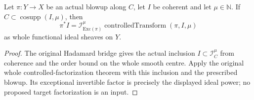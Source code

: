 \begin{lemma}
\label{pub:hadamard-whole-controlled-factor}
\leanok
Let $\pi:Y\to X$ be an actual blowup along $C$, let $I$ be coherent and let
$\mu\in\mathbb N$. If $C\subset\operatorname{cosupp}(I,\mu)$, then
\[
 \pi^*I=\mathcal I_{\mathrm{Exc}(\pi)}^{\mu}
          \operatorname{controlledTransform}(\pi,I,\mu)
\]
as whole functional ideal sheaves on $Y$.
\end{lemma}
\begin{proof}
The original Hadamard bridge gives the actual inclusion
$I\subset\mathcal I_C^\mu$ from coherence and the order bound on the whole
smooth centre. Apply the original whole controlled-factorization theorem with
this inclusion and the prescribed blowup. Its exceptional invertible factor
is precisely the displayed ideal power; no proposed target factorization is
an input.
\end{proof}
